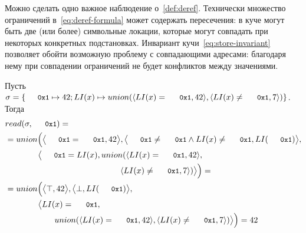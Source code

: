 Можно сделать одно важное наблюдение о~\autoref{def:deref}. Технически множество ограничений в~\eqref{eq:deref-formula} может содержать пересечения: в куче могут быть две (или более) символьные локации, которые могут совпадать при некоторых конкретных подстановках. Инвариант кучи~\eqref{eq:store-invariant} позволяет обойти возможную проблему с совпадающими адресами: благодаря нему при совпадении ограничений не будет конфликтов между  значениями.
%
\begin{exmp}
\allowdisplaybreaks
Пусть $\sigma = \{ \addr{0x1} \mapsto 42; \li{x} \mapsto \aunion(\pair{\mg{\li{x}}{\addr{0x1}}}{42},\pair{\nmg{\li{x}}{\addr{0x1}}}{7}) \}$. Тогда
\begin{align*}
&\deref{\sigma}{\addr{0x1}}=\\
&=\Union{\paiR{\mg{\addr{0x1}}{\addr{0x1}}}{42},\paiR{\nmg{\addr{0x1}}{\addr{0x1}}\wedge\nmg{\li{x}}{\addr{0x1}}}{\li{\addr{0x1}}},\\
&\qquad\qquad\paiR{\mg{\addr{0x1}}{\li{x}}}{\aunion(\pair{\mg{\li{x}}{\addr{0x1}}}{42},\\
&\qquad\qquad\qquad\qquad\qquad\qquad\qquad\pair{\nmg{\li{x}}{\addr{0x1}}}{7})}}=\\
&=\Union{\paiR{\top}{42},\paiR{\bot}{\li{\addr{0x1}}},\\
&\qquad\qquad\paiR{\mg{\li{x}}{\addr{0x1}}}{\\
&\qquad\qquad\qquad\aunion(\pair{\mg{\li{x}}{\addr{0x1}}}{42},\pair{\nmg{\li{x}}{\addr{0x1}}}{7})}}=42
\end{align*}
\end{exmp}
%
